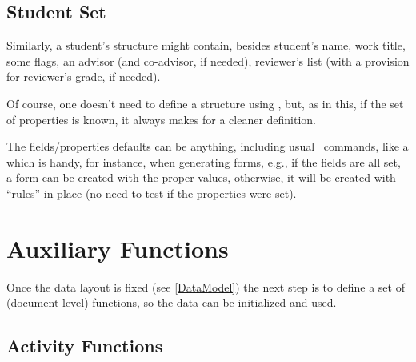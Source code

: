 \documentclass[10pt]{article}
\begin{document}
\subsection{Student Set}
Similarly, a student's structure might contain, besides student's name, work title, some flags, an advisor (and co-advisor, if needed), reviewer's list (with a provision for reviewer's grade, if needed).

Of course, one doesn't need to define a  structure using , but, as in this,  if the set of properties is known, it always makes for a cleaner definition.

\begin{tsremark}
  The fields/properties defaults can be anything, including usual \LaTeXe\  commands, like a \tsobj{\rule} which is handy, for instance, when generating forms, e.g., if the fields are all set, a form can be created with the proper values, otherwise, it will be  created with ``rules'' in place (no need to test if the properties were set).
\end{tsremark}




\section{Auxiliary Functions}
Once the data layout is fixed (see \ref{DataModel}) the next step is to define a set of (document level) functions, so the data can be initialized and used.

\subsection{Activity Functions}

\end{document}
